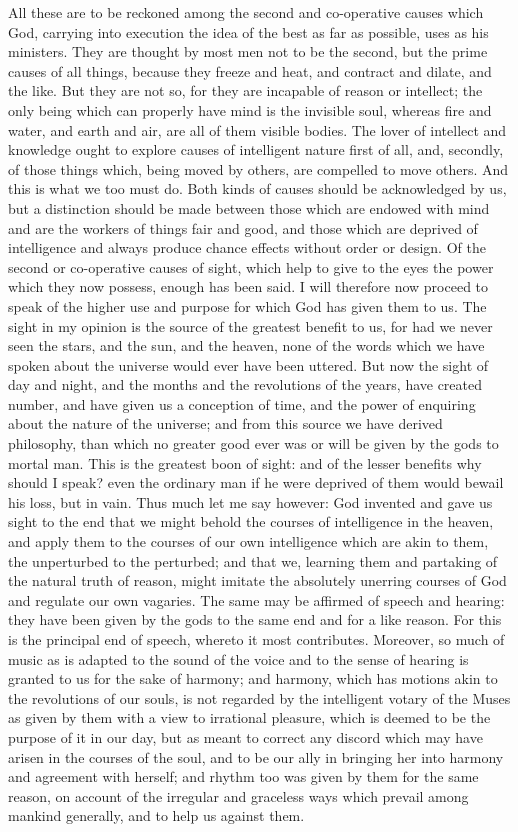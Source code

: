 All these are to be reckoned among the second and co-operative causes
which God, carrying into execution the idea of the best as far as
possible, uses as his ministers. They are thought by most men not to be
the second, but the prime causes of all things, because they freeze and
heat, and contract and dilate, and the like. But they are not so, for they
are incapable of reason or intellect; the only being which can properly
have mind is the invisible soul, whereas fire and water, and earth and
air, are all of them visible bodies. The lover of intellect and knowledge
ought to explore causes of intelligent nature first of all, and, secondly,
of those things which, being moved by others, are compelled to move
others. And this is what we too must do. Both kinds of causes should be
acknowledged by us, but a distinction should be made between those which
are endowed with mind and are the workers of things fair and good, and
those which are deprived of intelligence and always produce chance effects
without order or design. Of the second or co-operative causes of sight,
which help to give to the eyes the power which they now possess, enough
has been said. I will therefore now proceed to speak of the higher use and
purpose for which God has given them to us. The sight in my opinion is the
source of the greatest benefit to us, for had we never seen the stars, and
the sun, and the heaven, none of the words which we have spoken about the
universe would ever have been uttered. But now the sight of day and night,
and the months and the revolutions of the years, have created number, and
have given us a conception of time, and the power of enquiring about the
nature of the universe; and from this source we have derived philosophy,
than which no greater good ever was or will be given by the gods to mortal
man. This is the greatest boon of sight: and of the lesser benefits why
should I speak? even the ordinary man if he were deprived of them would
bewail his loss, but in vain. Thus much let me say however: God invented
and gave us sight to the end that we might behold the courses of
intelligence in the heaven, and apply them to the courses of our own
intelligence which are akin to them, the unperturbed to the perturbed; and
that we, learning them and partaking of the natural truth of reason, might
imitate the absolutely unerring courses of God and regulate our own
vagaries. The same may be affirmed of speech and hearing: they have been
given by the gods to the same end and for a like reason. For this is the
principal end of speech, whereto it most contributes. Moreover, so much of
music as is adapted to the sound of the voice and to the sense of hearing
is granted to us for the sake of harmony; and harmony, which has motions
akin to the revolutions of our souls, is not regarded by the intelligent
votary of the Muses as given by them with a view to irrational pleasure,
which is deemed to be the purpose of it in our day, but as meant to
correct any discord which may have arisen in the courses of the soul, and
to be our ally in bringing her into harmony and agreement with herself;
and rhythm too was given by them for the same reason, on account of the
irregular and graceless ways which prevail among mankind generally, and to
help us against them.

